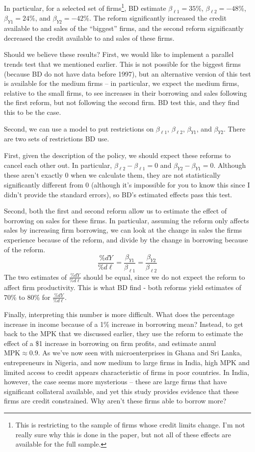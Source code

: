 \documentclass[12pt,english]{article}
\begin{document}
In particular, for a selected set of firms\footnote{This is restricting to the sample of firms whose credit limits change. I'm not really sure why this is done in the paper, but not all of these effects are available for the full sample.}, BD estimate $\beta_{\ell1} = 35\%$, $\beta_{\ell2} = -48\%$, $\beta_{Y1} = 24\%$, and $\beta_{Y2} = -42\%$. The reform significantly increased the credit available to and sales of the ``biggest'' firms, and the second reform significantly decreased the credit available to and sales of these firms.

Should we believe these results? First, we would like to implement a parallel trends test that we mentioned earlier. This is not possible for the biggest firms (because BD do not have data before 1997), but an alternative version of this test is available for the medium firms -- in particular, we expect the medium firms, relative to the small firms, to see increases in their borrowing and sales following the first reform, but not following the second firm. BD test this, and they find this to be the case.

Second, we can use a model to put restrictions on $\beta_{\ell1}$, $\beta_{\ell2}$, $\beta_{Y1}$, and $\beta_{Y2}$. There are two sets of restrictions BD use. 

First, given the description of the policy, we should expect these reforms to cancel each other out. In particular, $\beta_{\ell2} - \beta_{\ell1} = 0$ and $\beta_{Y2} - \beta_{Y1} = 0$. Although these aren't exactly 0 when we calculate them, they are not statistically significantly different from 0 (although it's impossible for you to know this since I didn't provide the standard errors), so BD's estimated effects pass this test.

Second, both the first and second reform allow us to estimate the effect of borrowing on sales for these firms. In particular, assuming the reform only affects sales by increasing firm borrowing, we can look at the change in sales the firms experience because of the reform, and divide by the change in borrowing because of the reform.
$$ \frac{\%dY}{\%d\ell} = \frac{\beta_{Y1}}{\beta_{\ell1}} = \frac{\beta_{Y2}}{\beta_{\ell2}} $$
The two estimates of $\frac{\%dY}{\%d\ell}$ should be equal, since we do not expect the reform to affect firm productivity. This is what BD find - both reforms yield estimates of 70\% to 80\% for $\frac{\%dY}{\%d\ell}$.

Finally, interpreting this number is more difficult. What does the percentage increase in income because of a 1\% increase in borrowing mean? Instead, to get back to the MPK that we discussed earlier, they use the reform to estimate the effect of a \$1 increase in borrowing on firm profits, and estimate annul $\text{MPK} \approx 0.9$. As we've now seen with microenterprises in Ghana and Sri Lanka, entrepreneurs in Nigeria, and now medium to large firms in India, high MPK and limited access to credit appears characteristic of firms in poor countries. In India, however, the case seems more mysterious -- these are large firms that have significant collateral available, and yet this study provides evidence that these firms are credit constrained. Why aren't these firms able to borrow more?
\end{document}
